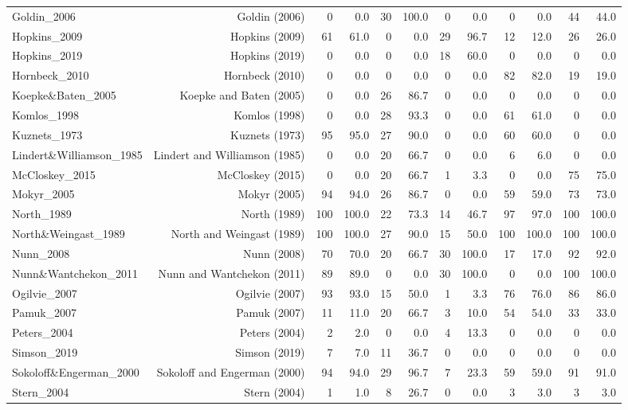 \begin{table}[ht]
\begin{tabular}{lrrrrrrrrrrr}
Goldin\_2006 & Goldin (2006) & 0 & 0.0 & 30 & 100.0 & 0 & 0.0 & 0 & 0.0 & 44 & 44.0 \\
Hopkins\_2009 & Hopkins (2009) & 61 & 61.0 & 0 & 0.0 & 29 & 96.7 & 12 & 12.0 & 26 & 26.0 \\
Hopkins\_2019 & Hopkins (2019) & 0 & 0.0 & 0 & 0.0 & 18 & 60.0 & 0 & 0.0 & 0 & 0.0 \\
Hornbeck\_2010 & Hornbeck (2010) & 0 & 0.0 & 0 & 0.0 & 0 & 0.0 & 82 & 82.0 & 19 & 19.0 \\
Koepke\&Baten\_2005 & Koepke and Baten (2005) & 0 & 0.0 & 26 & 86.7 & 0 & 0.0 & 0 & 0.0 & 0 & 0.0 \\
Komlos\_1998 & Komlos (1998) & 0 & 0.0 & 28 & 93.3 & 0 & 0.0 & 61 & 61.0 & 0 & 0.0 \\
Kuznets\_1973 & Kuznets (1973) & 95 & 95.0 & 27 & 90.0 & 0 & 0.0 & 60 & 60.0 & 0 & 0.0 \\
Lindert\&Williamson\_1985 & Lindert and Williamson (1985) & 0 & 0.0 & 20 & 66.7 & 0 & 0.0 & 6 & 6.0 & 0 & 0.0 \\
McCloskey\_2015 & McCloskey (2015) & 0 & 0.0 & 20 & 66.7 & 1 & 3.3 & 0 & 0.0 & 75 & 75.0 \\
Mokyr\_2005 & Mokyr (2005) & 94 & 94.0 & 26 & 86.7 & 0 & 0.0 & 59 & 59.0 & 73 & 73.0 \\
North\_1989 & North (1989) & 100 & 100.0 & 22 & 73.3 & 14 & 46.7 & 97 & 97.0 & 100 & 100.0 \\
North\&Weingast\_1989 & North and Weingast (1989) & 100 & 100.0 & 27 & 90.0 & 15 & 50.0 & 100 & 100.0 & 100 & 100.0 \\
Nunn\_2008 & Nunn (2008) & 70 & 70.0 & 20 & 66.7 & 30 & 100.0 & 17 & 17.0 & 92 & 92.0 \\
Nunn\&Wantchekon\_2011 & Nunn and Wantchekon (2011) & 89 & 89.0 & 0 & 0.0 & 30 & 100.0 & 0 & 0.0 & 100 & 100.0 \\
Ogilvie\_2007 & Ogilvie (2007) & 93 & 93.0 & 15 & 50.0 & 1 & 3.3 & 76 & 76.0 & 86 & 86.0 \\
Pamuk\_2007 & Pamuk (2007) & 11 & 11.0 & 20 & 66.7 & 3 & 10.0 & 54 & 54.0 & 33 & 33.0 \\
Peters\_2004 & Peters (2004) & 2 & 2.0 & 0 & 0.0 & 4 & 13.3 & 0 & 0.0 & 0 & 0.0 \\
Simson\_2019 & Simson (2019) & 7 & 7.0 & 11 & 36.7 & 0 & 0.0 & 0 & 0.0 & 0 & 0.0 \\
Sokoloff\&Engerman\_2000 & Sokoloff and Engerman (2000) & 94 & 94.0 & 29 & 96.7 & 7 & 23.3 & 59 & 59.0 & 91 & 91.0 \\
Stern\_2004 & Stern (2004) & 1 & 1.0 & 8 & 26.7 & 0 & 0.0 & 3 & 3.0 & 3 & 3.0 \\

\end{tabular}
\end{table}
